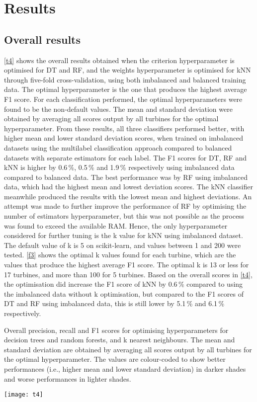 \chapter{Results}\label{c3}

\section{Overall results}

\autoref{t4} shows the overall results obtained when the criterion hyperparameter is optimised for DT and RF, and the weights hyperparameter is optimised for kNN through five-fold cross-validation, using both imbalanced and balanced training data. The optimal hyperparameter is the one that produces the highest average F1 score. For each classification performed, the optimal hyperparameters were found to be the non-default values. The mean and standard deviation were obtained by averaging all scores output by all turbines for the optimal hyperparameter. From these results, all three classifiers performed better, with higher mean and lower standard deviation scores, when trained on imbalanced datasets using the multilabel classification approach compared to balanced datasets with separate estimators for each label. The F1 scores for DT, RF and kNN is higher by 0.6\,\%, 0.5\,\% and 1.9\,\% respectively using imbalanced data compared to balanced data. The best performance was by RF using imbalanced data, which had the highest mean and lowest deviation scores. The kNN classifier meanwhile produced the results with the lowest mean and highest deviations. An attempt was made to further improve the performance of RF by optimising the number of estimators hyperparameter, but this was not possible as the process was found to exceed the available RAM. Hence, the only hyperparameter considered for further tuning is the k value for kNN using imbalanced dataset. The default value of k is 5 on scikit-learn, and values between 1 and 200 were tested. \autoref{f3} shows the optimal k values found for each turbine, which are the values that produce the highest average F1 score. The optimal k is 13 or less for 17 turbines, and more than 100 for 5 turbines. Based on the overall scores in \autoref{t4}, the optimisation did increase the F1 score of kNN by 0.6\,\% compared to using the imbalanced data without k optimisation, but compared to the F1 scores of DT and RF using imbalanced data, this is still lower by 5.1\,\% and 6.1\,\% respectively.

\begin{table}
  \centering
  \caption{\label{t4}Overall precision, recall and F1 scores for optimising hyperparameters for decision trees and random forests, and k nearest neighbours. The mean and standard deviation are obtained by averaging all scores output by all turbines for the optimal hyperparameter. The values are colour-coded to show better performances (i.e., higher mean and lower standard deviation) in darker shades and worse performances in lighter shades.}
  \texttt{[image: t4]}
\end{table}

